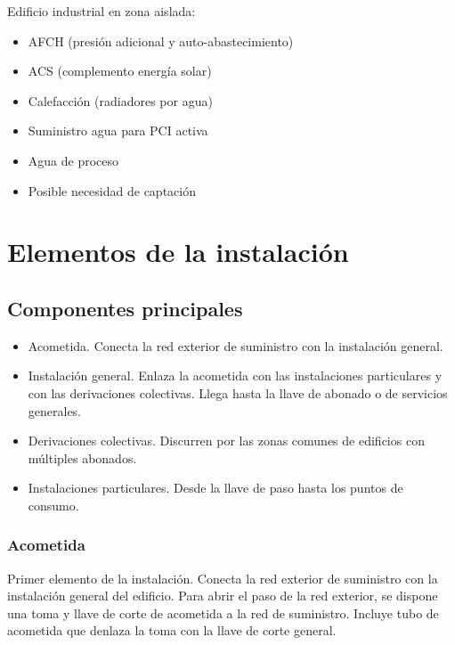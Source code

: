 Edificio industrial en zona aislada:
\begin{itemize}
    \item AFCH (presión adicional y auto-abastecimiento)
    \item ACS (complemento energía solar)
    \item Calefacción (radiadores por agua)
    \item Suministro agua para PCI activa
    \item Agua de proceso
    \item Posible necesidad de captación
\end{itemize}

\section{Elementos de la instalación}
\subsection{Componentes principales}
\begin{itemize}
    \item Acometida. Conecta la red exterior de suministro con la instalación general.
    \item Instalación general. Enlaza la acometida con las instalaciones particulares y con las derivaciones colectivas. Llega hasta la llave de abonado o de servicios generales.
    \item Derivaciones colectivas. Discurren por las zonas comunes de edificios con múltiples abonados.
    \item Instalaciones particulares. Desde la llave de paso hasta los puntos de consumo.
\end{itemize}

\subsubsection{Acometida}
Primer elemento de la instalación. Conecta la red exterior de suministro con la instalación general del edificio. Para abrir el paso de la red exterior, se dispone una toma y llave de corte de acometida a la red de suministro. Incluye tubo de acometida que denlaza la toma con la llave de corte general.

